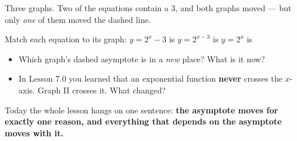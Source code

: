 \documentclass[10pt]{article}
\newcommand{\lgrid}[4]{%
  \draw[step=1, linegray!40, very thin] (#1,#3) grid (#2,#4);
  \draw[->, semithick, charcoal] (#1,0)--(#2,0) node[below right, font=\scriptsize]{$x$};
  \draw[->, semithick, charcoal] (0,#3)--(0,#4) node[left, font=\scriptsize]{$y$};}
\newcommand{\expgraph}[6]{\draw[very thick, forest, domain=#5:#6, samples=140, smooth]
  plot (\x,{(#1)*exp((#2)*((\x)-(#3)))+(#4)});}
\newcommand{\hasym}[3]{\draw[navy, dashed, semithick] (#1,#3)--(#2,#3);}
\begin{document}
\begin{hookbox}
Three graphs. Two of the equations contain a $3$, and both graphs moved --- but only \emph{one} of
them moved the dashed line.
\begin{center}
\end{center}
\vspace{2pt}
Match each equation to its graph: \quad $y=2^{x}-3$ \; is \blank{1.0cm} \quad
$y=2^{x-3}$ \; is \blank{1.0cm} \quad $y=2^{x}$ \; is \blank{1.0cm}
\begin{itemize}\setlength{\itemsep}{1pt}
  \item Which graph's dashed asymptote is in a \emph{new} place? What is it now? \writeline
  \item In Lesson 7.0 you learned that an exponential function \textbf{never} crosses the $x$-axis. Graph II crosses it. What changed? \writeline
\end{itemize}
Today the whole lesson hangs on one sentence: \textbf{the asymptote moves for exactly one reason, and
everything that depends on the asymptote moves with it.}
\end{hookbox}
\end{document}
